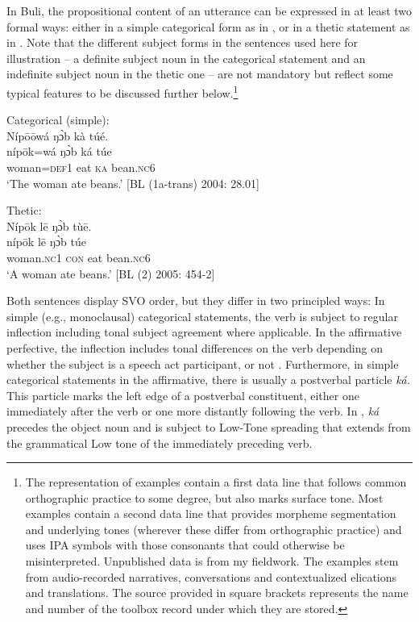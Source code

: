 \documentclass[output=paper]{langsci/langscibook}
\begin{document}
In Buli, the propositional content of an utterance can be expressed in at least two formal ways: either in a simple categorical form as in , or in a thetic statement as in . Note that the different subject forms in the sentences used here for illustration – a definite subject noun in the categorical statement and an indefinite subject noun in the thetic one – are not mandatory but reflect some typical features to be discussed further below.\footnote{The representation of examples contain a first data line that follows common orthographic practice to some degree, but also marks surface tone. Most examples contain a second data line that provides morpheme segmentation and underlying tones (wherever these differ from orthographic practice) and uses IPA symbols with those consonants that could otherwise be misinterpreted. Unpublished data is from my fieldwork. The examples stem from audio-recorded narratives, conversations and contextualized elications and translations. The source provided in square brackets represents the name and number of the toolbox record under which they are stored.} 
 
\ea\label{ex:schwarz:5}
 Categorical (simple):  \\
\glll Níp\={o}\={o}wá  ŋ\`{ɔ}b  kà  túé.\\
    \textup{níp\={o}k=wá } \textup{ŋ\`{ɔ}b}  \textup{ká} \textup{túe}\\
     woman=\textsc{def}1  eat  \textsc{ka}  bean.\textsc{nc}6\\
\glt ‘The woman ate beans.’ [BL (1a-trans) 2004: 28.01]
\z

\ea\label{ex:schwarz:6}
Thetic: \\
\glll Níp\={o}k    l\={e}  ŋ\`{ɔ}b  tù\={e}.\\
     \textup{níp\={o}k}    l\={e}  \textup{ŋ\`{ɔ}b}  \textup{túe}\\
     woman.\textsc{nc}1  \textsc{con}  eat  bean.\textsc{nc}6\\
\glt ‘A woman ate beans.’ [BL (2) 2005: 454-2]
\z

Both sentences display SVO order, but they differ in two principled ways: In simple (e.g., monoclausal) categorical statements, the verb is subject to regular inflection including tonal subject agreement where applicable. In the affirmative perfective, the inflection includes tonal differences on the verb depending on whether the subject is a speech act participant, or not \citep{Schwarz2007}. Furthermore, in simple categorical statements in the affirmative, there is usually a postverbal particle \textit{ká.} This particle marks the left edge of a postverbal constituent, either one immediately after the verb or one more distantly following the verb. In , \textit{ká} precedes the object noun and is subject to Low-Tone spreading that extends from the grammatical Low tone of the immediately preceding verb.
\end{document}
